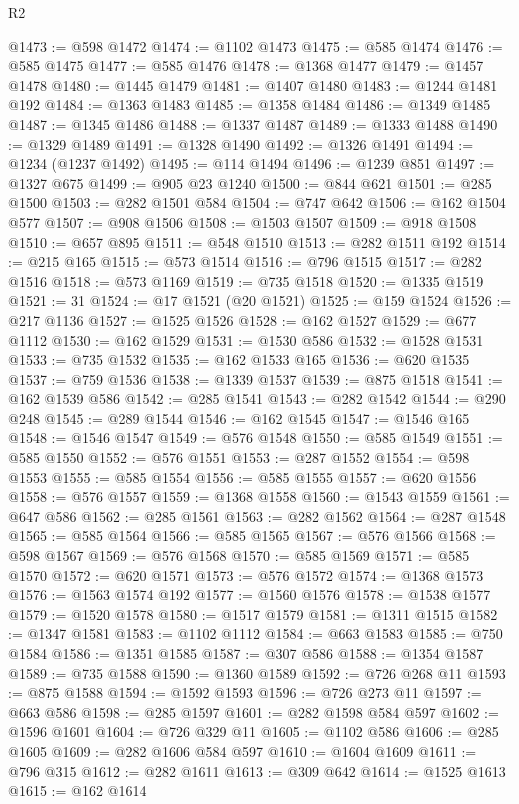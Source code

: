 \begin{lexlean}{R2}
\begin{coremodule}
@1473 := @598 @1472
@1474 := @1102 @1473
@1475 := @585 @1474
@1476 := @585 @1475
@1477 := @585 @1476
@1478 := @1368 @1477
@1479 := @1457 @1478
@1480 := @1445 @1479
@1481 := @1407 @1480
@1483 := @1244 @1481 @192
@1484 := @1363 @1483
@1485 := @1358 @1484
@1486 := @1349 @1485
@1487 := @1345 @1486
@1488 := @1337 @1487
@1489 := @1333 @1488
@1490 := @1329 @1489
@1491 := @1328 @1490
@1492 := @1326 @1491
@1494 := @1234 (@1237 @1492)
@1495 := @114 @1494
@1496 := @1239 @851
@1497 := @1327 @675
@1499 := @905 @23 @1240
@1500 := @844 @621
@1501 := @285 @1500
@1503 := @282 @1501 @584
@1504 := @747 @642
@1506 := @162 @1504 @577
@1507 := @908 @1506
@1508 := @1503 @1507
@1509 := @918 @1508
@1510 := @657 @895
@1511 := @548 @1510
@1513 := @282 @1511 @192
@1514 := @215 @165
@1515 := @573 @1514
@1516 := @796 @1515
@1517 := @282 @1516
@1518 := @573 @1169
@1519 := @735 @1518
@1520 := @1335 @1519
@1521 := 31
@1524 := @17 @1521 (@20 @1521)
@1525 := @159 @1524
@1526 := @217 @1136
@1527 := @1525 @1526
@1528 := @162 @1527
@1529 := @677 @1112
@1530 := @162 @1529
@1531 := @1530 @586
@1532 := @1528 @1531
@1533 := @735 @1532
@1535 := @162 @1533 @165
@1536 := @620 @1535
@1537 := @759 @1536
@1538 := @1339 @1537
@1539 := @875 @1518
@1541 := @162 @1539 @586
@1542 := @285 @1541
@1543 := @282 @1542
@1544 := @290 @248
@1545 := @289 @1544
@1546 := @162 @1545
@1547 := @1546 @165
@1548 := @1546 @1547
@1549 := @576 @1548
@1550 := @585 @1549
@1551 := @585 @1550
@1552 := @576 @1551
@1553 := @287 @1552
@1554 := @598 @1553
@1555 := @585 @1554
@1556 := @585 @1555
@1557 := @620 @1556
@1558 := @576 @1557
@1559 := @1368 @1558
@1560 := @1543 @1559
@1561 := @647 @586
@1562 := @285 @1561
@1563 := @282 @1562
@1564 := @287 @1548
@1565 := @585 @1564
@1566 := @585 @1565
@1567 := @576 @1566
@1568 := @598 @1567
@1569 := @576 @1568
@1570 := @585 @1569
@1571 := @585 @1570
@1572 := @620 @1571
@1573 := @576 @1572
@1574 := @1368 @1573
@1576 := @1563 @1574 @192
@1577 := @1560 @1576
@1578 := @1538 @1577
@1579 := @1520 @1578
@1580 := @1517 @1579
@1581 := @1311 @1515
@1582 := @1347 @1581
@1583 := @1102 @1112
@1584 := @663 @1583
@1585 := @750 @1584
@1586 := @1351 @1585
@1587 := @307 @586
@1588 := @1354 @1587
@1589 := @735 @1588
@1590 := @1360 @1589
@1592 := @726 @268 @11
@1593 := @875 @1588
@1594 := @1592 @1593
@1596 := @726 @273 @11
@1597 := @663 @586
@1598 := @285 @1597
@1601 := @282 @1598 @584 @597
@1602 := @1596 @1601
@1604 := @726 @329 @11
@1605 := @1102 @586
@1606 := @285 @1605
@1609 := @282 @1606 @584 @597
@1610 := @1604 @1609
@1611 := @796 @315
@1612 := @282 @1611
@1613 := @309 @642
@1614 := @1525 @1613
@1615 := @162 @1614

\end{coremodule}
\end{lexlean}
